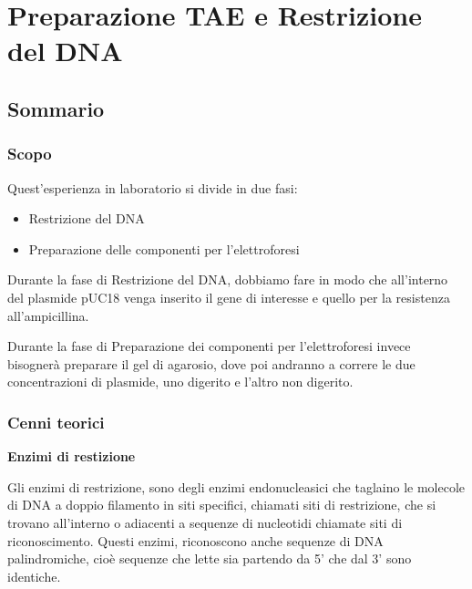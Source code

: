 \section{\LARGE{Preparazione TAE e Restrizione del DNA}}

\vspace{0.6cm}


\subsection{Sommario}

\subsubsection{Scopo}

Quest'esperienza in laboratorio si divide in due fasi:

\begin{itemize}

	\item Restrizione del DNA
	
	\item Preparazione delle componenti per l'elettroforesi 

\end{itemize}

Durante la fase di Restrizione del DNA, dobbiamo fare in modo che all'interno del plasmide pUC18 venga inserito il gene di interesse e quello per la resistenza all'ampicillina. 
\vspace{0.3cm}

Durante la fase di Preparazione dei componenti per l'elettroforesi invece bisognerà preparare il gel di agarosio, dove poi andranno a correre le due concentrazioni di plasmide, uno digerito e l'altro non digerito.

\subsubsection{Cenni teorici}

\textbf{Enzimi di restizione}
\vspace{0.3cm}



Gli enzimi di restrizione, sono degli enzimi endonucleasici che taglaino le molecole di DNA a doppio filamento in siti specifici, chiamati siti di restrizione, che si trovano all'interno o adiacenti a sequenze di nucleotidi chiamate siti di riconoscimento.
Questi enzimi, riconoscono anche sequenze di DNA palindromiche, cioè sequenze che lette sia partendo da 5' che dal 3' sono identiche.

